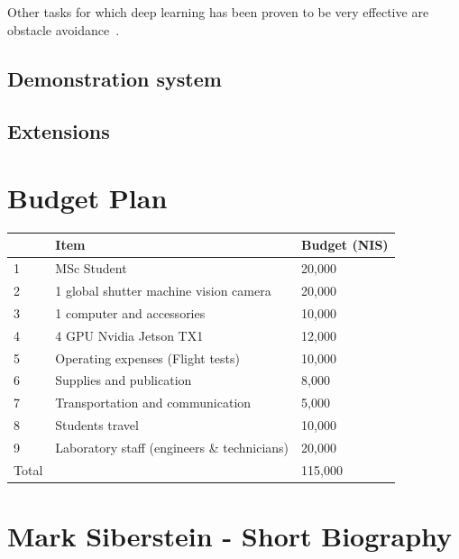 \documentclass{article} %
\begin{document}
Other tasks for which deep learning has been proven to be very effective are
obstacle avoidance~\cite{hadsell2009learning, eigen2014depth, ross2013learning}.

\subsection{Demonstration system}


\subsection{Extensions}


\section{Budget Plan}

\begin{center}
	\begin{tabular}{ | l | l | l | }
		\hline
				& Item 											& Budget (NIS) 	\\ \hline
		1		& MSc Student 									& 20,000    	\\ \hline
		2		& 1 global shutter machine vision camera 		& 20,000 		\\ \hline
		3 		& 1 computer and accessories 					& 10,000 		\\ \hline
		4 		& 4 GPU Nvidia Jetson TX1	 					& 12,000 		\\ \hline
		5 		& Operating expenses (Flight tests) 			& 10,000 		\\ \hline
		6 		& Supplies and publication	 					& 8,000 		\\ \hline
		7 		& Transportation and communication				& 5,000 		\\ \hline
		8 		& Students travel 								& 10,000 		\\ \hline
		9 		& Laboratory staff (engineers \& technicians)	& 20,000 		\\ \hline
		Total 	&  							 					& 115,000 		\\ \hline
	\end{tabular}
\end{center}

\section{Mark Siberstein - Short Biography}



\end{document}
